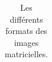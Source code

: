 \begin{table}[H]
\begin{tabular}{|l|l|l|l|}
%	
%		
	\end{tabular}
	\caption{Les différents formats des images matricielles.}
\end{table}


